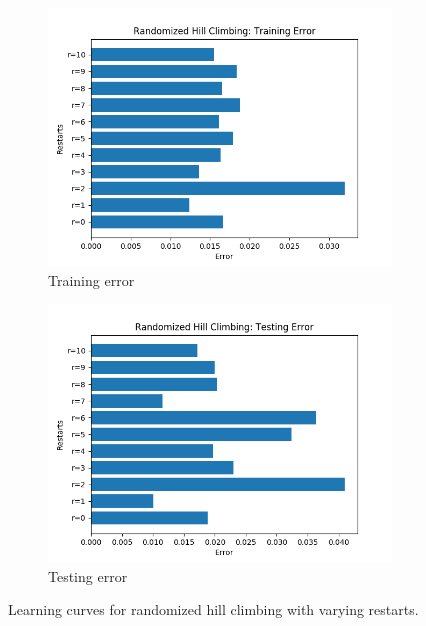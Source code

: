 \documentclass{article}
\begin{document}
        \begin{figure}[htb]
        \centering

        \begin{subfigure}{0.5\textwidth}
          \includegraphics[width=\linewidth]{out/rhc/restarts-training.png}
          \caption{Training error}
          \label{fig:rhc-params-1}
        \end{subfigure}\hfil
        \begin{subfigure}{0.5\textwidth}
          \includegraphics[width=\linewidth]{out/rhc/restarts-testing.png}
          \caption{Testing error}
          \label{fig:rhc-params-2}
        \end{subfigure}

        \caption{Learning curves for randomized hill climbing with varying restarts.}
        \label{fig:rhc-params}
        \end{figure}
\end{document}

